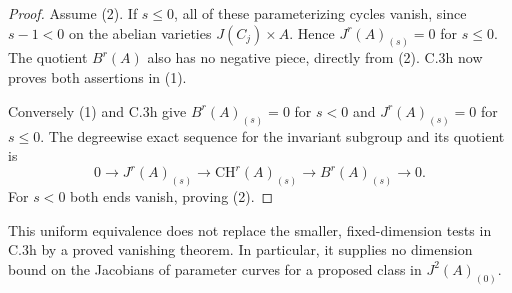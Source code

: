 \begin{proof}
Assume (2). If $s\le0$, all of these parameterizing cycles
vanish, since $s-1<0$ on the abelian varieties
$J(C_j)\times A$. Hence $J^r(A)_{(s)}=0$ for $s\le0$.
The quotient $B^r(A)$ also has no negative piece, directly
from (2). C.3h now proves both assertions in (1).

Conversely (1) and C.3h give $B^r(A)_{(s)}=0$ for $s<0$
and $J^r(A)_{(s)}=0$ for $s\le0$. The degreewise exact
sequence for the invariant subgroup and its quotient is
\[
 0\longrightarrow J^r(A)_{(s)}
 \longrightarrow\mathrm{CH}^r(A)_{(s)}
 \longrightarrow B^r(A)_{(s)}\longrightarrow0.
\]
For $s<0$ both ends vanish, proving (2).
\end{proof}

This uniform equivalence does not replace the smaller,
fixed-dimension tests in C.3h by a proved vanishing theorem.
In particular, it supplies no dimension bound on the
Jacobians of parameter curves for a proposed class in
$J^2(A)_{(0)}$.
